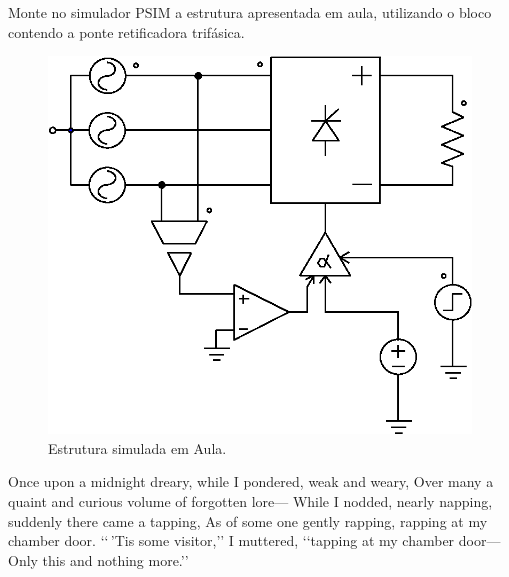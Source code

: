 \documentclass[11pt]{utfpr-exam}
\begin{document}
\begin{questions}
				
				
\question[25]
\label{Q:revisao}
				
			Monte no simulador PSIM a estrutura apresentada em aula, utilizando o bloco contendo a ponte retificadora trifásica.
			
							
							
\begin{figure}[!ht]
	\centering
	\includegraphics[width=0.5\linewidth]{figuras/SimularEstruturaBloco}
	\caption{Estrutura simulada em Aula.}
	\label{fig:SimularEstruturaBloco}
\end{figure}
			

\begin{solution}
	Once upon a midnight dreary, while I pondered, weak and weary,
	Over many a quaint and curious volume of forgotten lore--- While I
	nodded, nearly napping, suddenly there came a tapping, As of some
	one gently rapping, rapping at my chamber door. ‘‘\,’Tis some
	visitor,’’ I muttered, ‘‘tapping at my chamber door--- Only this
	and nothing more.’’
\end{solution}
			

\end{questions}
\end{document}
